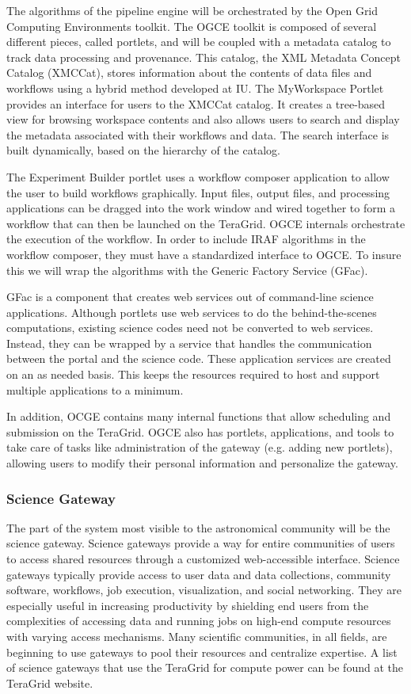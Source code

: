 \documentclass[10pt,conference]{IEEEtran}
\begin{document}
The algorithms of the pipeline engine will be orchestrated by the Open Grid Computing Environments toolkit. The OGCE toolkit is composed of several different pieces, called portlets, and will be coupled with a metadata catalog to track data processing and provenance. This catalog, the XML Metadata Concept Catalog (XMCCat)\cite{jensen2008}, stores information about the contents of data files and workflows using a hybrid method developed at IU. The MyWorkspace Portlet provides an interface for users to the XMCCat catalog. It creates a tree-based view for browsing workspace contents and also allows users to search and display the metadata associated with their workflows and data. The search interface is built dynamically, based on the hierarchy of the catalog. 

The Experiment Builder portlet uses a workflow composer application to allow the user to build workflows graphically. Input files, output files, and processing applications can be dragged into the work window and wired together to form a workflow that can then be launched on the TeraGrid. OGCE internals orchestrate the execution of the workflow. In order to include IRAF algorithms in the workflow composer, they must have a standardized interface to OGCE. To insure this we will wrap the algorithms with the Generic Factory Service (GFac).
 
GFac is a component that creates web services out of command-line science applications. Although portlets use web services to do the behind-the-scenes computations, existing science codes need not be converted to web services. Instead, they can be wrapped by a service that handles the communication between the portal and the science code. These application services are created on an as needed basis. This keeps the resources required to host and support multiple applications to a minimum.

In addition, OCGE contains many internal functions that allow scheduling and submission on the TeraGrid. OGCE also has portlets, applications, and tools to take care of tasks like administration of the gateway (e.g. adding new portlets), allowing users to modify their personal information and personalize the gateway.

\subsubsection{Science Gateway}

The part of the system most visible to the astronomical community will be the science gateway. Science gateways provide a way for entire communities of users to access shared resources through a customized web-accessible interface. Science gateways typically provide access to user data and data collections, community software, workflows, job execution, visualization, and social networking. They are especially useful in increasing productivity by shielding end users from the complexities of accessing data and running jobs on high-end compute resources with varying access mechanisms.
Many scientific communities, in all fields, are beginning to use gateways to pool their resources and centralize expertise.  A list of science gateways that use the TeraGrid for compute power can be found at the TeraGrid website.  
\end{document}
